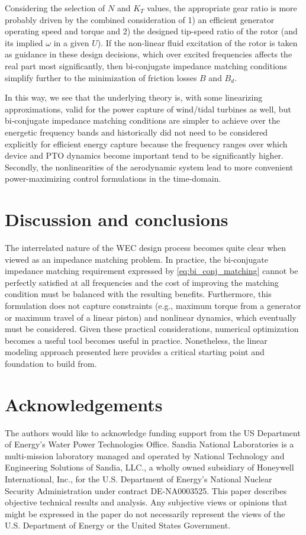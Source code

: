 \documentclass[lettersize,journal]{IEEEtran}
\begin{document}
{Considering the selection of $N$ and $K_T$ values, the appropriate gear ratio is more probably driven by the combined consideration of 1) an efficient generator operating speed and torque and 2) the designed tip-speed ratio of the rotor (and its implied $\omega$ in a given $U$).
If the non-linear fluid excitation of the rotor is taken as guidance in these design decisions, which over excited frequencies affects the real part most significantly, then bi-conjugate impedance matching conditions simplify further to the minimization of friction losses $B$ and $B_d$.

In this way, we see that the underlying theory is, with some linearizing approximations, valid for the power capture of wind/tidal turbines as well, but bi-conjugate impedance matching conditions are simpler to achieve over the energetic frequency bands and historically did not need to be considered explicitly for efficient energy capture because the frequency ranges over which device and PTO dynamics become important tend to be significantly higher.
Secondly, the nonlinearities of the aerodynamic system lead to more convenient power-maximizing control formulations in the time-domain.

\section{Discussion and conclusions}
The interrelated nature of the WEC design process becomes quite clear when viewed as an impedance matching problem.
In practice, the bi-conjugate impedance matching requirement expressed by \eqref{eq:bi_conj_matching} cannot be perfectly satisfied at all frequencies and the cost of improving the matching condition must be balanced with the resulting benefits.
Furthermore, this formulation does not capture constraints (e.g., maximum torque from a generator or maximum travel of a linear piston) and nonlinear dynamics, which eventually must be considered.
Given these practical considerations, numerical optimization becomes a useful tool becomes useful in practice.
Nonetheless, the linear modeling approach presented here provides a critical starting point and foundation to build from.

\section{Acknowledgements}
The authors would like to acknowledge funding support from the US Department of Energy's Water Power Technologies Office.
Sandia National Laboratories is a multi-mission laboratory managed and operated by National Technology and Engineering Solutions of Sandia, LLC., a wholly owned subsidiary of Honeywell International, Inc., for the U.S. Department of Energy's National Nuclear Security Administration under contract DE-NA0003525.
This paper describes objective technical results and analysis.
Any subjective views or opinions that might be expressed in the paper do not necessarily represent the views of the U.S. Department of Energy or the United States Government.

}
\end{document}
